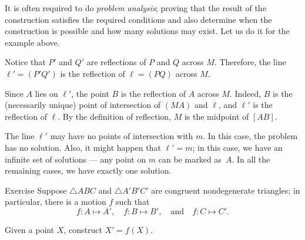 It is often required to do \emph{problem analysis};
proving that the result of the construction satisfies the required conditions and also determine when the construction is possible and how many solutions may exist.
Let us do it for the example above.


Notice that $P'$ and $Q'$ are reflections of $P$ and $Q$ across $M$.
Therefore, the line $\ell'=(P'Q')$ is the reflection of $\ell=(PQ)$ across $M$.

Since $A$ lies on $\ell'$,
the point $B$ is the reflection of $A$ across $M$.
Indeed, $B$ is the (necessarily unique) point of intersection of $(MA)$ and $\ell$, and $\ell'$ is the reflection of $\ell$.
By the definition of reflection, $M$ is the midpoint of $[AB]$.

The line $\ell'$ may have no points of intersection with $m$.
In this case, the problem has no solution.
Also, it might happen that $\ell'=m$;
in this case, we have an infinite set of solutions --- any point on $m$ can be marked as~$A$.
In all the remaining cases, we have exactly one solution.
\qeds

\begin{thm}{Exercise}\label{ex:motion}
Suppose $\triangle ABC$ and $\triangle A'B'C'$ are congruent nondegenerate triangles;
in particular, there is a motion $f$ such that
\[f\colon A\mapsto A',\quad f\colon B\mapsto B',\quad\text{and}\quad f\colon C\mapsto C'.\]

Given a point $X$, construct $X'=f(X)$.
\end{thm}


